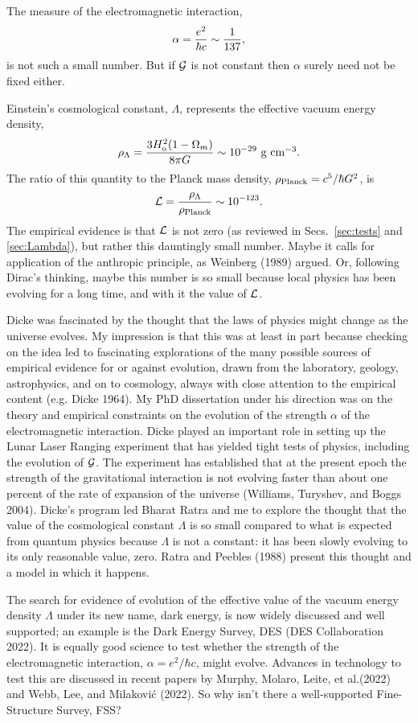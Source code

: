 \documentclass[fleqn,12pt]{article}
\newcommand{\beq}{\begin{equation}}
\newcommand{\eeq}{\end{equation}}
\begin{document}
The measure of the electromagnetic interaction,
\beq
\alpha = {e^2\over\hbar c}\sim {1\over 137}, \label{eq:alpha}
\eeq
is not such a small number. But if ${\cal G}$ is not constant then $\alpha$ surely need not be fixed either.

Einstein's cosmological constant, $\Lambda$, represents the effective vacuum energy density, 
\beq
\rho_\Lambda = {3 H_{\rm o}^2(1 - \Omega_m)\over 8 \pi G}
\sim 10^{-29}$~g~cm$^{-3}.
\eeq
The ratio of this quantity to the Planck mass density, $\rho_{\rm Planck}=c^5/\hbar G^2$, is
\beq
{\cal L} = {\rho_{\Lambda}\over\rho_{\rm Planck}} \sim 10^{-123}.
\eeq
The empirical evidence is that $\cal L$ is not zero (as reviewed in Secs.~\ref{sec:tests} and \ref{sec:Lambda}), but rather this dauntingly small number. Maybe it calls for application of the anthropic principle, as Weinberg (1989) argued. Or, following Dirac's thinking, maybe this number is so small because local physics has been evolving for a long time, and with it the value of $\cal L$. 

Dicke was fascinated by the thought that the laws of physics might change as the universe evolves. My impression is that this was at least in part because checking on the idea led to fascinating explorations of the many possible sources of empirical evidence for or against evolution, drawn from the laboratory, geology, astrophysics, and on to cosmology, always with close attention to the empirical content (e.g. Dicke 1964). My PhD dissertation under his direction was on the theory and empirical constraints on the evolution of the strength $\alpha$ of the electromagnetic interaction. Dicke played an important role in setting up the Lunar Laser Ranging experiment that has yielded  tight tests of physics, including the evolution of ${\cal G}$. The experiment has established that at the present epoch the strength of the gravitational interaction is not evolving faster than about one percent of the rate of expansion of the universe (Williams, Turyshev, and Boggs 2004). Dicke's program led Bharat Ratra and me to explore the thought that the value of the cosmological constant $\Lambda$ is so small compared to what is expected from quantum physics because $\Lambda$ is not a constant: it has been slowly evolving to its only reasonable value, zero. Ratra and Peebles (1988) present this thought and a model in which it happens. 

 The search for evidence of evolution of the effective value of the vacuum energy density $\Lambda$ under its new name, dark energy, is now widely discussed and well supported; an example is the Dark Energy Survey, DES (DES Collaboration 2022). It is equally good science to test whether the strength of the electromagnetic interaction, $\alpha = e^2/\hbar c$, might evolve. Advances in technology to test this are discussed in recent papers by  Murphy, Molaro, Leite, et al.(2022) and Webb, Lee, and Milakovi{\'c} (2022). So why isn't there a well-supported Fine-Structure Survey, FSS? 
\end{document}

